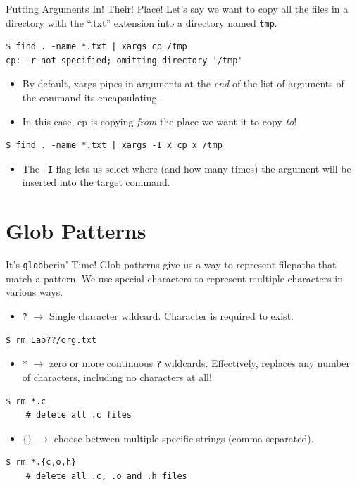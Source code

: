 \documentclass[11pt]{beamer}
\begin{document}
\begin{frame}[fragile=singleslide]{Putting Arguments In! Their! Place!}
Let's say we want to copy all the files in a directory with the ``.txt'' extension into a directory named \texttt{tmp}.
\begin{lstlisting}[style=terminal]
$ find . -name *.txt | xargs cp /tmp
cp: -r not specified; omitting directory '/tmp'
\end{lstlisting}
\begin{itemize}
\item By default, xargs pipes in arguments at the \emph{end} of the list of arguments of the command its encapsulating.
\item In this case, cp is copying \emph{from} the place we want it to copy \emph{to}!
\end{itemize}
\begin{lstlisting}[style=terminal]
$ find . -name *.txt | xargs -I x cp x /tmp
\end{lstlisting}
\begin{itemize}
\item The \texttt{-I} flag lets us select where (and how many times) the argument will be inserted into the target command.  
\end{itemize}
\end{frame}

\section[Glob]{Glob Patterns}
\begin{frame}[fragile=singleslide]{It's \texttt{glob}berin' Time!}
Glob patterns give us a way to represent filepaths that match a pattern.  We use special characters to represent multiple characters in various ways.
\begin{itemize}
\item \texttt{?} $\rightarrow$ Single character wildcard.  Character is required to exist.
\end{itemize}
\begin{lstlisting}[style=terminal]
$ rm Lab??/org.txt
\end{lstlisting}
\begin{itemize}
\item \texttt{\**} $\rightarrow$ zero or more continuous \texttt{?} wildcards.  Effectively, replaces any number of characters, including no characters at all!
\end{itemize}
\begin{lstlisting}[style=terminal]
$ rm *.c 
	# delete all .c files 
\end{lstlisting}
\begin{itemize}
\item $\{\}$ $\rightarrow$ choose between multiple specific strings (comma separated).
\end{itemize}
\begin{lstlisting}[style=terminal]
$ rm *.{c,o,h}
	# delete all .c, .o and .h files
\end{lstlisting}
\end{frame}
\end{document}

